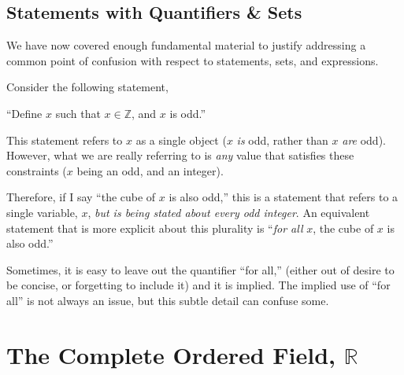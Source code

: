 \documentclass[letterpaper,twoside]{article}
\begin{document}
\begin{multicols}{2}



\subsection{Statements with Quantifiers \& Sets}

We have now covered enough fundamental material to justify addressing a common point of confusion with respect to statements, sets, and expressions.

Consider the following statement,

``Define $x$ such that $x \in \mathbb{Z}$, and $x$ is odd.''

This statement refers to $x$ as a single object ($x$ \textit{is} odd, rather than $x$ \textit{are} odd).
However, what we are really referring to is \textit{any} value that satisfies these constraints ($x$ being an odd, and an integer).

Therefore, if I say ``the cube of $x$ is also odd,'' this is a statement that refers to a single variable, $x$, \textit{but is being stated about every odd integer}.
An equivalent statement that is more explicit about this plurality is ``\textit{for all} $x$, the cube of $x$ is also odd.''

Sometimes, it is easy to leave out the quantifier ``for all,'' (either out of desire to be concise, or forgetting to include it) and it is implied.
The implied use of ``for all'' is not always an issue, but this subtle detail can confuse some.

\section{The Complete Ordered Field, $\mathbb{R}$}


\end{multicols}
\end{document}
